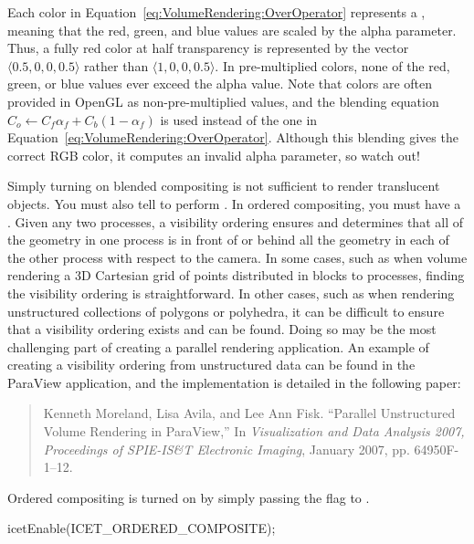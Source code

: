 Each color in Equation~\ref{eq:VolumeRendering:OverOperator} represents a
, meaning that
the red, green, and blue values are scaled by the alpha parameter.  Thus, a
fully red color at half transparency is represented by the vector $\langle
0.5, 0, 0, 0.5 \rangle$ rather than $\langle 1, 0, 0, 0.5 \rangle$.  In
pre-multiplied colors, none of the red, green, or blue values ever exceed
the alpha value.  Note that colors are often provided in OpenGL as
non-pre-multiplied values, and the blending equation $C_o \leftarrow C_f
\alpha_f + C_b (1 - \alpha_f)$ is used instead of the one in
Equation~\ref{eq:VolumeRendering:OverOperator}.  Although this blending
gives the correct RGB color, it computes an invalid alpha parameter, so
watch out!


Simply turning on blended compositing is not sufficient to render
translucent objects.  You must also tell \IceT to perform .  In ordered compositing, you must have a
.  Given any two
processes, a visibility ordering ensures and determines that all of the
geometry in one process is in front of or behind all the geometry in each
of the other process with respect to the camera.  In some cases, such as
when volume rendering a 3D Cartesian grid of points distributed in blocks
to processes, finding the visibility ordering is straightforward.  In other
cases, such as when rendering unstructured collections of polygons or
polyhedra, it can be difficult to ensure that a visibility ordering exists
and can be found.  Doing so may be the most challenging part of creating a
parallel rendering application.  An example of creating a visibility
ordering from unstructured data can be found in the ParaView application,
and the implementation is detailed in the following paper:

\begin{quote}
  Kenneth Moreland, Lisa Avila, and Lee Ann Fisk. ``Parallel Unstructured
  Volume Rendering in ParaView,'' In \emph{Visualization and Data Analysis
    2007, Proceedings of SPIE-IS\&T Electronic Imaging}, January 2007,
  pp. 64950F-1--12.
\end{quote}

Ordered compositing is turned on by simply passing the
 flag to .
\begin{code}
  icetEnable(ICET_ORDERED_COMPOSITE);
\end{code}


